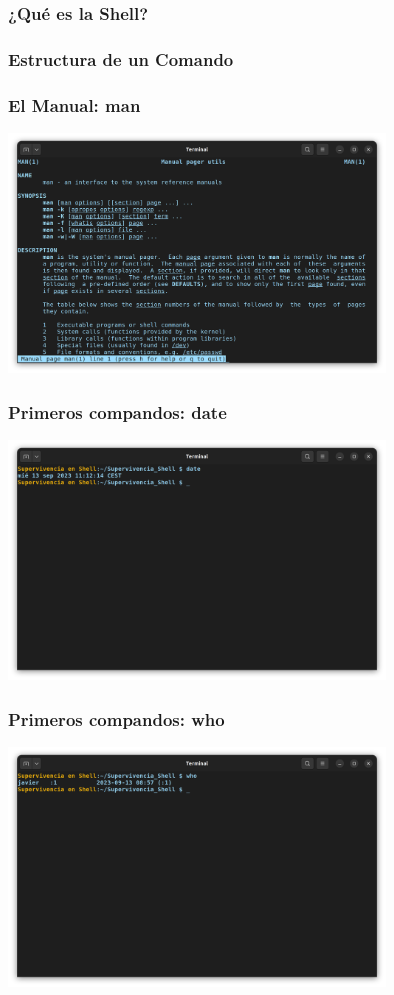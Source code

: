 \documentclass[10pt]{beamer}
\begin{document}
	\begin{frame}
		\frametitle{¿Qué es la Shell?}
	\end{frame}

	\begin{frame}
		\frametitle{Estructura de un Comando}
	\end{frame}
	
	\begin{frame}
		\frametitle{El Manual: man}
		\includegraphics[width=0.75\textwidth]{man}
	\end{frame}

	\begin{frame}
		\frametitle{Primeros compandos: date}
		\includegraphics[width=0.75\textwidth]{date}
	\end{frame}
	
	\begin{frame}
		\frametitle{Primeros compandos: who}
		\includegraphics[width=0.75\textwidth]{who}
	\end{frame}
	
\end{document}
